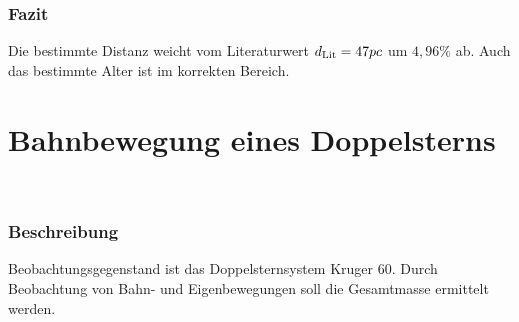 \documentclass[12pt]{article}
\begin{document}
\subsubsection*{Fazit}
Die bestimmte Distanz weicht vom Literaturwert $d_{\textnormal{Lit}} = 47pc$ um $4,96\%$ ab. Auch das bestimmte Alter ist im korrekten Bereich.
\newpage\noindent\section{Bahnbewegung eines Doppelsterns}\
\subsubsection*{Beschreibung}
Beobachtungsgegenstand ist das Doppelsternsystem Kruger 60. Durch Beobachtung von Bahn- und Eigenbewegungen soll die Gesamtmasse ermittelt werden.
\end{document}
